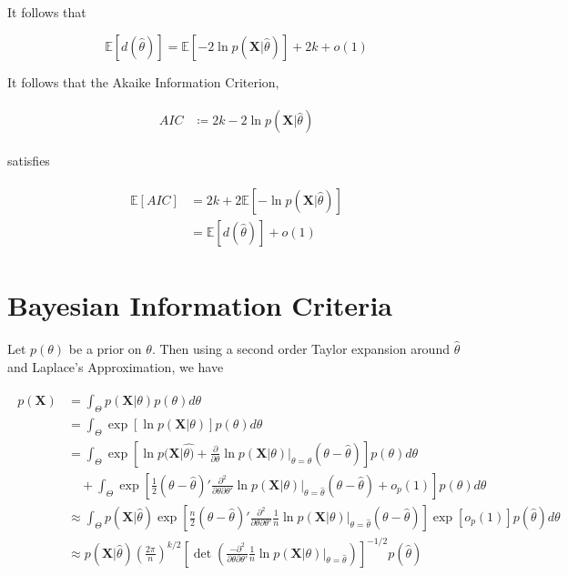 \documentclass[11pt]{article}
\begin{document}
It follows that

\begin{equation}
\mathbb{E} \left[ d\left( \hat{\theta} \right) \right] = \mathbb{E} \left[ -2\ln{p(\mathbf{X} \vert \hat{\theta})} \right] + 2k + o(1)
\end{equation}

It follows that the Akaike Information Criterion,

\begin{align}
\begin{split}
AIC &\coloneqq 2k - 2\ln{p(\mathbf{X} \vert \hat{\theta})}
\end{split}
\end{align}

satisfies

\begin{align}
\begin{split}
\mathbb{E} \left[ AIC \right] &= 2k + 2 \mathbb{E} \left[- \ln{p(\mathbf{X} \vert \hat{\theta})} \right] \\
&= \mathbb{E} \left[ d \left( \hat{\theta} \right) \right] + o(1)
\end{split}
\end{align}

\section{Bayesian Information Criteria}

Let $p(\theta)$ be a prior on $\theta$. Then using a second order Taylor expansion around $\hat{\theta}$ and Laplace's Approximation, we have

\begin{align}
\begin{split}
p(\mathbf{X}) &= \int_{\Theta}p(\mathbf{X} \vert \theta) p(\theta)d\theta \\
&= \int_{\Theta}\exp{\left[\ln{p(\mathbf{X} \vert \theta)}\right]}p(\theta)d\theta \\
&= \int_{\Theta}\exp{\left[
\ln{p(\mathbf{X} \vert \hat{\theta)}} + \frac{\partial}{\partial\theta}\ln{p(\mathbf{X} \vert \theta)} \vert_{\theta=\hat{\theta}}(\theta - \hat{\theta})
\right]}p(\theta)d\theta \\
& \quad + \int_{\Theta}\exp{\left[ \frac{1}{2}(\theta - \hat{\theta})'\frac{\partial^2}{\partial\theta\partial\theta'}\ln{p(\mathbf{X} \vert \theta)} \vert_{\theta=\hat{\theta}}(\theta-\hat{\theta}) + o_p(1)
\right]}p(\theta)d\theta \\
& \approx \int_{\Theta}p(\mathbf{X} \vert \hat{\theta})\exp{\left[ \frac{n}{2}(\theta - \hat{\theta})'\frac{\partial^2}{\partial\theta\partial\theta'}\frac{1}{n}\ln{p(\mathbf{X} \vert \theta)} \vert_{\theta=\hat{\theta}}(\theta-\hat{\theta}) \right]} \exp{\left[o_p(1)\right]}p(\hat{\theta})d\theta \\
& \approx p(\mathbf{X} \vert \hat{\theta}) \left( \frac{2\pi}{n} \right)^{k/2}\left[\det{\left(\frac{-\partial^2}{\partial\theta\partial\theta'}\frac{1}{n}\ln{p(\mathbf{X} \vert \theta)} \vert_{\theta=\hat{\theta}}\right)}\right]^{-1/2}p(\hat{\theta})
\end{split}
\end{align}
\end{document}

